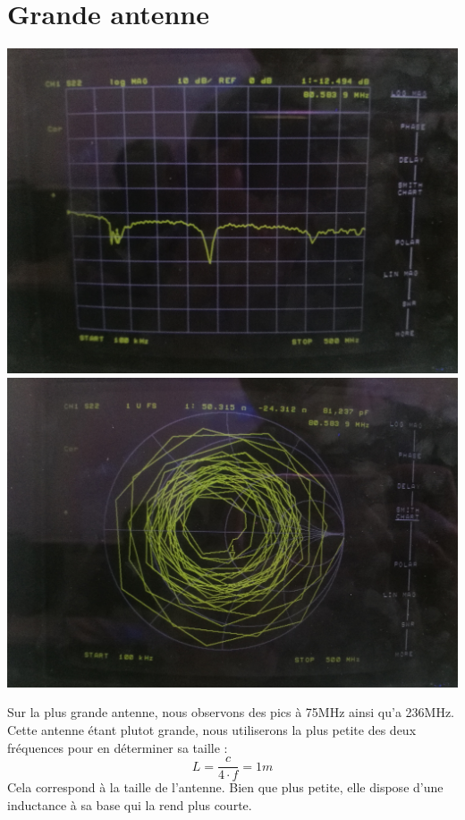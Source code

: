 \documentclass[a4paper,12pt]{report}            %
\begin{document}
\section {Grande antenne}

\begin{center}
	\includegraphics[scale = 0.062]{pic/S_grande.jpg}
	\includegraphics[scale = 0.065]{pic/Smith_grande.jpg} 
\end{center}

Sur la plus grande antenne, nous observons des pics à 75MHz ainsi qu'a 236MHz. Cette antenne étant plutot grande,
nous utiliserons la plus petite des deux fréquences pour en déterminer sa taille :
$$ L = \frac{c}{4\cdot f} = 1m$$
Cela correspond à la taille de l'antenne. Bien que plus petite, elle dispose d'une inductance à sa base qui
la rend plus courte.
\end{document}
